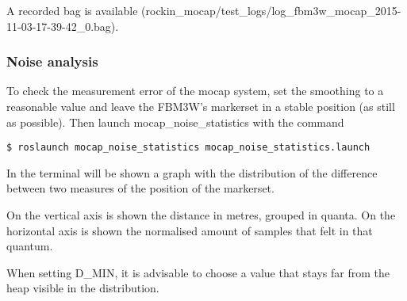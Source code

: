 \documentclass[a4paper]{article}
\begin{document}
A recorded bag is available (rockin\_mocap/test\_logs/log_fbm3w_mocap_2015-11-03-17-39-42_0.bag).


\subsubsection{Noise analysis}
\label{sec:fbm3w_noise_analysis}

To check the measurement error of the mocap system, set the smoothing to a reasonable value and leave the FBM3W's markerset in a stable position (as still as possible).
Then launch mocap\_noise\_statistics with the command

\begin{verbatim}
$ roslaunch mocap_noise_statistics mocap_noise_statistics.launch
\end{verbatim}

In the terminal will be shown a graph with the distribution of the difference between two measures of the position of the markerset.

On the vertical axis is shown the distance in metres, grouped in quanta.
On the horizontal axis is shown the normalised amount of samples that felt in that quantum.

When setting D_MIN, it is advisable to choose a value that stays far from the heap visible in the distribution.

\clearpage
\end{document}
